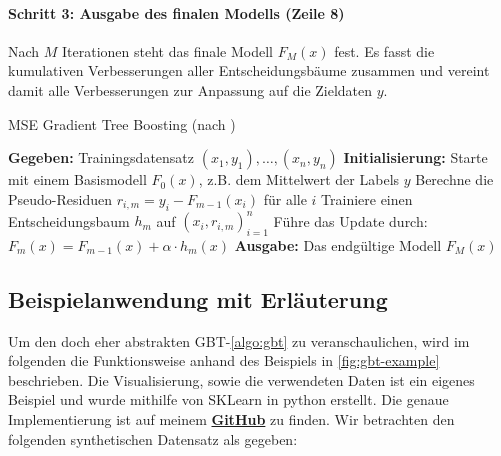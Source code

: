 \paragraph{Schritt 3: Ausgabe des finalen Modells (Zeile 8)}
Nach \( M \) Iterationen steht das finale Modell \( F_M(x) \) fest. Es fasst die kumulativen Verbesserungen aller Entscheidungsbäume zusammen und vereint damit alle Verbesserungen zur Anpassung auf die Zieldaten \(y\).

\begin{algorithm}[H]
    \caption[MSE Gradient Tree Boosting]{MSE Gradient Tree Boosting (nach \textcite[S.~346]{Frochte2020})}\label{algo:gbt}
    \begin{algorithmic}[1]
    \State \textbf{Gegeben:} Trainingsdatensatz \( (x_1,y_1), \dots, (x_n,y_n) \)
    \State \textbf{Initialisierung:} Starte mit einem Basismodell \( F_0(x) \), z.B. dem Mittelwert der Labels \( y \)
        \State Berechne die Pseudo-Residuen \( r_{i,m} = y_i - F_{m-1}(x_i) \) für alle \( i \)
        \State Trainiere einen Entscheidungsbaum \( h_m \) auf \( (x_i, r_{i,m})_{i=1}^n \)
        \State Führe das Update durch: \( F_m(x) = F_{m-1}(x) + \alpha \cdot h_m(x) \)
    \EndFor
    \State \textbf{Ausgabe:} Das endgültige Modell \( F_M(x) \)
    \end{algorithmic}
\end{algorithm}

\subsection{Beispielanwendung mit Erläuterung}
Um den doch eher abstrakten GBT-\autoref{algo:gbt} zu veranschaulichen, wird im folgenden die Funktionsweise anhand des Beispiels in \autoref{fig:gbt-example} beschrieben.
\newline
Die Visualisierung, sowie die verwendeten Daten ist ein eigenes Beispiel und wurde mithilfe von SKLearn in python erstellt. Die genaue Implementierung ist auf meinem \textbf{\href{https://github.com/CodeLtDave/Boosting-Algorithms-ML-Seminararbeit/blob/main/python-env/GBT-Example.ipynb}{GitHub}} zu finden. Wir betrachten den folgenden synthetischen Datensatz als gegeben:

